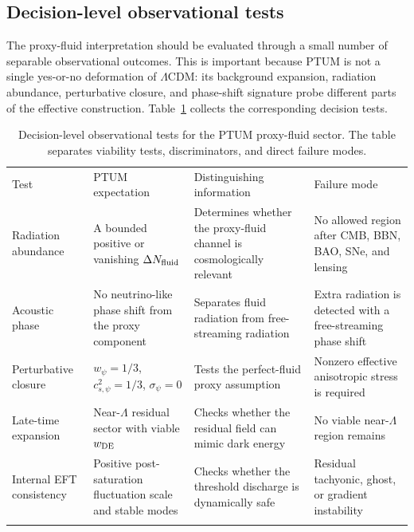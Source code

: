 \documentclass[epj]{svjour}
\begin{document}
\subsection{Decision-level observational tests}
\label{sec:decision_tests}

The proxy-fluid interpretation should be evaluated through a small number of
separable observational outcomes.  This is important because PTUM is not a
single yes-or-no deformation of \(\Lambda\)CDM: its background expansion,
radiation abundance, perturbative closure, and phase-shift signature probe
different parts of the effective construction.  Table~\ref{tab:decision_tests}
collects the corresponding decision tests.

\begin{table}[t]
\caption{Decision-level observational tests for the PTUM proxy-fluid sector.
The table separates viability tests, discriminators, and direct failure modes.}
\label{tab:decision_tests}
\centering
\small
\begin{tabular}{p{}p{}p{}p{}}
\hline\noalign{\smallskip}
Test & PTUM expectation & Distinguishing information & Failure mode \\
\noalign{\smallskip}\hline\noalign{\smallskip}
Radiation abundance & A bounded positive or vanishing
\(\Delta N_{\rm fluid}\) & Determines whether the proxy-fluid channel is
cosmologically relevant & No allowed region after CMB, BBN, BAO, SNe, and lensing \\
Acoustic phase & No neutrino-like phase shift from the proxy component & Separates fluid radiation from free-streaming radiation & Extra radiation is detected with a free-streaming phase shift \\
Perturbative closure & \(w_\psi=1/3\), \(c_{s,\psi}^2=1/3\), \(\sigma_\psi=0\) & Tests the perfect-fluid proxy assumption & Nonzero effective anisotropic stress is required \\
Late-time expansion & Near-\(\Lambda\) residual sector with viable \(w_{\rm DE}\) & Checks whether the residual field can mimic dark energy & No viable near-\(\Lambda\) region remains \\
Internal EFT consistency & Positive post-saturation fluctuation scale and stable modes & Checks whether the threshold discharge is dynamically safe & Residual tachyonic, ghost, or gradient instability \\
\noalign{\smallskip}\hline
\end{tabular}
\end{table}
\end{document}
